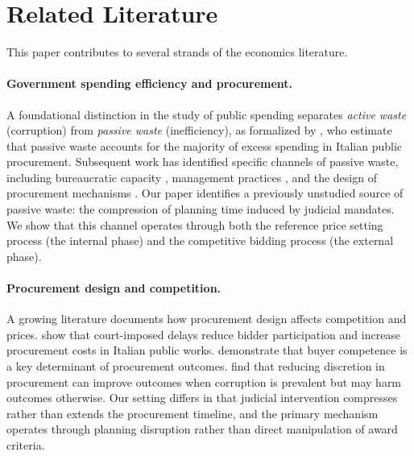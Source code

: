 \section{Related Literature}
\label{sec:literature}

This paper contributes to several strands of the economics literature.

\paragraph{Government spending efficiency and procurement.}
A foundational distinction in the study of public spending separates \textit{active waste} (corruption) from \textit{passive waste} (inefficiency), as formalized by \citet{bandiera2009active}, who estimate that passive waste accounts for the majority of excess spending in Italian public procurement. Subsequent work has identified specific channels of passive waste, including bureaucratic capacity \citep{best2023procurement}, management practices \citep{rasul2018management, bloom2015impact}, and the design of procurement mechanisms \citep{lewisfaupel2016can, szucs2023competition}. Our paper identifies a previously unstudied source of passive waste: the compression of planning time induced by judicial mandates. We show that this channel operates through both the reference price setting process (the internal phase) and the competitive bidding process (the external phase).

\paragraph{Procurement design and competition.}
A growing literature documents how procurement design affects competition and prices. \citet{coviello2018bidding} show that court-imposed delays reduce bidder participation and increase procurement costs in Italian public works. \citet{decarolis2018buyer} demonstrate that buyer competence is a key determinant of procurement outcomes. \citet{baltrunaite2021discretion} find that reducing discretion in procurement can improve outcomes when corruption is prevalent but may harm outcomes otherwise. Our setting differs in that judicial intervention compresses rather than extends the procurement timeline, and the primary mechanism operates through planning disruption rather than direct manipulation of award criteria.

